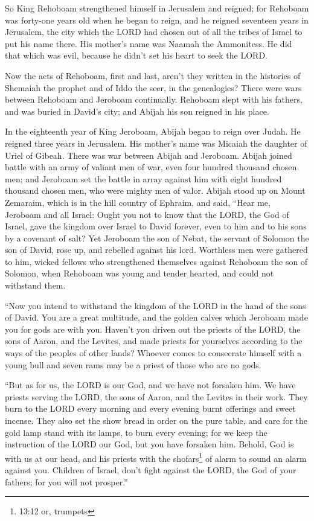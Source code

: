 \myverse{}So King Rehoboam strengthened himself in Jerusalem and reigned;
for Rehoboam was forty-one years old when he began to reign, and he reigned seventeen years in Jerusalem,
the city which the LORD had chosen out of all the tribes of Israel to put his name there. His mother’s
name was Naamah the Ammonitess.
\myverse{}He did that which was evil, because he didn’t set his heart to seek the LORD.

\myverse{}Now the acts of Rehoboam, first and last, aren’t they written
in the histories of Shemaiah the prophet and of Iddo the seer, in the genealogies? There were wars between
Rehoboam and Jeroboam continually.
\myverse{}Rehoboam slept with his fathers, and was buried in David’s city; and Abijah
his son reigned in his place.


\mychapter{} \myverse*{}In the eighteenth year of King Jeroboam, Abijah began to reign
over Judah.
\myverse{}He reigned three years in Jerusalem. His mother’s name was Micaiah the daughter
of Uriel of Gibeah. There was war between Abijah and Jeroboam.
\myverse{}Abijah joined battle with an army of valiant men of war, even four hundred
thousand chosen men; and Jeroboam set the battle in array against him with eight hundred thousand chosen
men, who were mighty men of valor.
\myverse{}Abijah stood up on Mount Zemaraim, which is in the hill country of Ephraim,
and said, “Hear me, Jeroboam and all Israel:
\myverse{}Ought you not to know that the LORD, the God of Israel, gave the kingdom over
Israel to David forever, even to him and to his sons by a covenant of salt?
\myverse{}Yet Jeroboam the son of Nebat, the servant of Solomon the son of David, rose
up, and rebelled against his lord.
\myverse{}Worthless men were gathered to him, wicked fellows who strengthened themselves
against Rehoboam the son of Solomon, when Rehoboam was young and tender hearted, and could not withstand
them.

\myverse{}“Now you intend to withstand the kingdom of the LORD in the hand
of the sons of David. You are a great multitude, and the golden calves which Jeroboam made you for gods
are with you.
\myverse{}Haven’t you driven out the priests of the LORD, the sons of Aaron, and the
Levites, and made priests for yourselves according to the ways of the peoples of other lands? Whoever
comes to consecrate himself with a young bull and seven rams may be a priest of those who are no gods.

\myverse{}“But as for us, the LORD is our God, and we have not forsaken
him. We have priests serving the LORD, the sons of Aaron, and the Levites in their work.
\myverse{}They burn to the LORD every morning and every evening burnt offerings and
sweet incense. They also set the show bread in order on the pure table, and care for the gold lamp stand
with its lamps, to burn every evening; for we keep the instruction of the LORD our God, but you have forsaken
him.
\myverse{}Behold, God is with us at our head, and his priests with the shofars\footnote{13:12 or, trumpets}
of alarm to sound an alarm against you. Children of Israel, don’t fight against the LORD, the God of your
fathers; for you will not prosper.”


